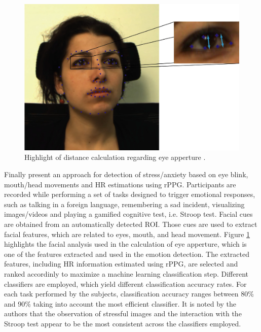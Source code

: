 \begin{figure}[h]
    \centering
    \includegraphics[width=\linewidth]{Content/figures/giannakakis2017stress-eye.png}
    \caption{Highlight of distance calculation regarding eye apperture \parencite{giannakakis2017stress}.}
    \label{fig:giannakakis2017stress-eye}
\end{figure}

Finally \textcite{giannakakis2017stress} present an approach for detection of stress/anxiety based on eye blink, mouth/head movements and HR estimations using rPPG. Participants are recorded while performing a set of tasks designed to trigger emotional responses, such as talking in a foreign language, remembering a sad incident, visualizing images/videos and playing a gamified cognitive test, i.e. Stroop test. Facial cues are obtained from an automatically detected ROI. Those cues are used to extract facial features, which are related to eyes, mouth, and head movement. Figure \ref{fig:giannakakis2017stress-eye} highlights the facial analysis used in the calculation of eye apperture, which is one of the features extracted and used in the emotion detection. The extracted features, including HR information estimated using rPPG, are selected and ranked accordinly to maximize a machine learning classification step. Different classifiers are employed, which yield different classification accuracy rates. For each task performed by the subjects, classification accuracy ranges between 80\% and 90\% taking into account the most efficient classifier. It is noted by the authors that the observation of stressful images and the interaction with the Stroop test appear to be the most consistent across the classifiers employed.
